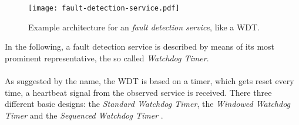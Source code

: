 \begin{figure}[!htbp]
\centering
\texttt{[image: fault-detection-service.pdf]}
\caption{Example architecture for an \emph{fault detection service}, like a WDT.}
\label{fig:fault-detection-service}
\end{figure}

In the following, a fault detection service is described by means of its most prominent representative, the so called \emph{Watchdog Timer}.
\\
\\
As suggested by the name, the WDT is based on a timer, which gets reset every time, a heartbeat signal from the observed service is received. There three different basic designs: the \emph{Standard Watchdog Timer}, the \emph{Windowed Watchdog Timer} and the \emph{Sequenced Watchdog Timer} \cite{elattar2007}.


